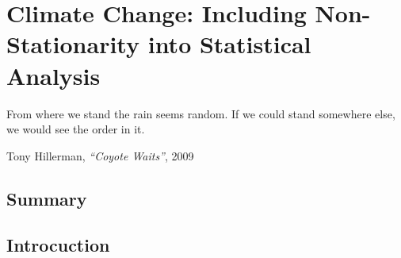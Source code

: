 \chapter[Climate Change]{Climate Change: Including Non-Stationarity into Statistical Analysis} \label{ch5:climatechange}
\setlength{\epigraphwidth}{4.5in}
\epigraph{From where we stand the rain seems random. If we could stand somewhere else, we would see the order in it.}{Tony Hillerman, \textit{``Coyote Waits''}, 2009}

\section*{Summary}

\section{Introcuction}

